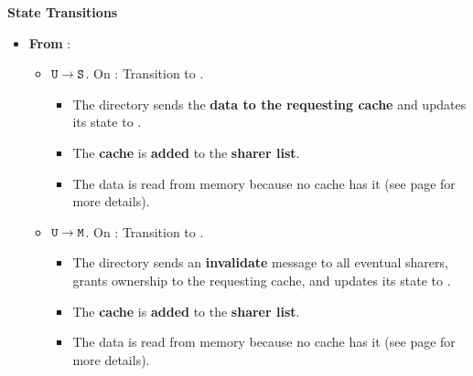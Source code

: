 \newpage

\begin{flushleft}
    \textcolor{Green3}{ \textbf{State Transitions}}
\end{flushleft}
\begin{itemize}
    \item \textbf{From }:
    \begin{itemize}
        \item $\texttt{U} \to \texttt{S}$. On : Transition to .
        \begin{itemize}
            \item The directory sends the \textbf{data to the requesting cache} and updates its state to .
            \item The \textbf{cache} is \textbf{added} to the \textbf{sharer list}.
            \item The data is read from memory because no cache has it (see page  for more details).
        \end{itemize}
        \item $\texttt{U} \to \texttt{M}$. On : Transition to .
        \begin{itemize}
            \item The directory sends an \textbf{invalidate} message to all eventual sharers, grants ownership to the requesting cache, and updates its state to .
            \item The \textbf{cache} is \textbf{added} to the \textbf{sharer list}.
            \item The data is read from memory because no cache has it (see page  for more details).
        \end{itemize}
    \end{itemize}


\end{itemize}
